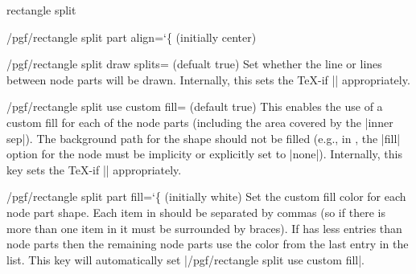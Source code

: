 \begin{shape}{rectangle split}
\begin{key}{/pgf/rectangle split part align={\ttfamily\char`\{} (initially center)}
\begin{codeexample}[]
\def\x{\Large w\nodepart{two}x\nodepart{three}\Huge y\nodepart{four}\tiny z}
\end{codeexample}

  \end{key}
   
  \begin{key}{/pgf/rectangle split draw splits= (defualt true)}
  	Set whether the line or lines between node parts will be drawn.
  	Internally, this sets the \TeX-if |\ifpgfrectanglesplitdrawsplits| 
  	appropriately.
  \end{key}
  
  \begin{key}{/pgf/rectangle split use custom fill= (default true)}
    This enables the use of a custom fill for each of the node
    parts (including the area covered by the |inner sep|). The 
    background path for the shape should not be filled (e.g., in
    \tikzname{}, the |fill|
    option for the node must be implicity or explicitly set to |none|).
    Internally, this key sets the \TeX-if 
    |\ifpgfrectanglesplitusecustomfill| appropriately.
  \end{key}
  
  \begin{key}{/pgf/rectangle split part fill={\ttfamily\char`\{} (initially white)}
  	Set the custom fill color for each node part shape. 
  	Each item in  should be separated by commas (so if 
  	there is more than one item in  it must be surrounded 
  	by braces).
  	If   has less entries than node
    parts then the remaining node parts use the color from
    the last entry in the list. This key will automatically set
    |/pgf/rectangle split use custom fill|.
    
\begin{codeexample}[]
\end{codeexample}


\end{key}
\end{shape}
